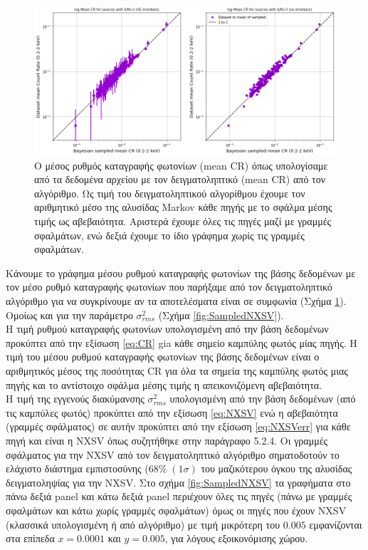 \begin{figure}  \includegraphics[width=1.12\linewidth]{Figures/Sampled Mean CR.png} \caption{Ο μέσος ρυθμός καταγραφής φωτονίων \textlatin{(mean CR)} όπως υπολογίσαμε από τα δεδομένα αρχείου με τον δειγματοληπτικό \textlatin{(mean CR)} από τον αλγόριθμο. Ως τιμή του δειγματοληπτικού αλγορίθμου έχουμε τον αριθμητικό μέσο της αλυσίδας \textlatin{Markov} κάθε πηγής με το σφάλμα μέσης τιμής ως αβεβαιότητα. Αριστερά έχουμε όλες τις πηγές μαζί με γραμμές σφαλμάτων, ενώ δεξιά έχουμε το ίδιο γράφημα χωρίς τις γραμμές σφαλμάτων.} \label{fig:SampledMeanCR}\end{figure}

Κάνουμε το γράφημα μέσου ρυθμού καταγραφής φωτονίων της βάσης δεδομένων με τον μέσο ρυθμό καταγραφής φωτονίων που παρήξαμε από τον δειγματοληπτικό αλγόριθμο για να συγκρίνουμε αν τα αποτελέσματα είναι σε συμφωνία (Σχήμα \ref{fig:SampledMeanCR}). Ομοίως και για την παράμετρο $\sigma_{rms}^2$ (Σχήμα \ref{fig:SampledNXSV}).\\
Η τιμή ρυθμού καταγραφής φωτονίων υπολογισμένη από την βάση δεδομένων προκύπτει από την εξίσωση \ref{eq:CR} gia κάθε σημείο καμπύλης φωτός μίας πηγής. Η τιμή του μέσου ρυθμού καταγραφής φωτονίων της βάσης δεδομένων είναι ο αριθμητικός μέσος της ποσότητας \textlatin{CR} για όλα τα σημεία της καμπύλης φωτός μιας πηγής και το αντίστοιχο σφάλμα μέσης τιμής η απεικονιζόμενη αβεβαιότητα.\\
Η τιμή της εγγενούς διακύμανσης $\sigma_{rms}^2$ υπολογισμένη από την βάση δεδομένων (από τις καμπύλες φωτός) προκύπτει από την εξίσωση \ref{eq:NXSV} ενώ η αβεβαιότητα (γραμμές σφάλματος) σε αυτήν προκύπτει από την εξίσωση \ref{eq:NXSVerr} για κάθε πηγή και είναι η \textlatin{NXSV} όπως συζητήθηκε στην παράγραφο 5.2.4. Οι γραμμές σφάλματος για την \textlatin{NXSV} από τον δειγματοληπτικό αλγόριθμο σηματοδοτούν το ελάχιστο διάστημα εμπιστοσύνης ($68\% \; (1 \sigma)$ του μαζικότερου όγκου της αλυσίδας δειγματοληψίας για την \textlatin{NXSV}. Στο σχήμα \ref{fig:SampledNXSV} τα γραφήματα στο πάνω δεξιά \textlatin{panel} και κάτω δεξιά \textlatin{panel} περιέχουν όλες τις πηγές (πάνω με γραμμές σφαλμάτων και κάτω χωρίς γραμμές σφαλμάτων) όμως οι πηγές που έχουν \textlatin{NXSV} (κλασσικά υπολογισμένη ή από αλγόριθμο) με τιμή μικρότερη του $0.005$ εμφανίζονται στα επίπεδα $x=0.0001$ και $y=0.005$, για λόγους εξοικονόμισης χώρου.

